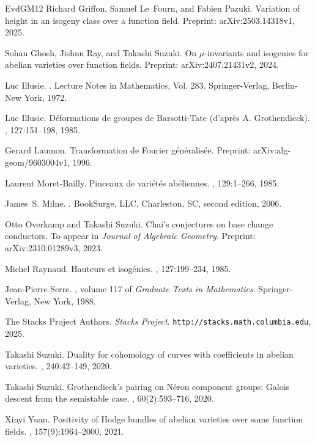\documentclass{amsart}
\theoremstyle{remark}
\numberwithin{equation}{section}
\begin{document}
\begin{thebibliography}{EvdGM12}
Richard Griffon, Samuel Le~Fourn, and Fabien Pazuki.
\newblock Variation of height in an isogeny class over a function field.
\newblock Preprint: arXiv:2503.14318v1, 2025.

Sohan Ghosh, Jishnu Ray, and Takashi Suzuki.
\newblock On {$\mu$}-invariants and isogenies for abelian varieties over
  function fields.
\newblock Preprint: arXiv:2407.21431v2, 2024.

Luc Illusie.
.
\newblock Lecture Notes in Mathematics, Vol. 283. Springer-Verlag, Berlin-New
  York, 1972.

Luc Illusie.
\newblock D\'{e}formations de groupes de {B}arsotti-{T}ate (d'apr\`es {A}.
  {G}rothendieck).
, 127:151--198, 1985.

Gerard Laumon.
\newblock Transformation de {F}ourier g\'{e}n\'{e}ralis\'{e}e.
\newblock Preprint: arXiv:alg-geom/9603004v1, 1996.

Laurent Moret-Bailly.
\newblock Pinceaux de vari\'{e}t\'{e}s ab\'{e}liennes.
, 129:1--266, 1985.

James~S. Milne.
.
\newblock BookSurge, LLC, Charleston, SC, second edition, 2006.

Otto Overkamp and Takashi Suzuki.
\newblock Chai's conjectures on base change conductors.
\newblock To appear in \textit{Journal of Algebraic Geometry}. Preprint:
  arXiv:2310.01289v3, 2023.

Michel Raynaud.
\newblock Hauteurs et isog\'{e}nies.
, 127:199--234, 1985.

Jean-Pierre Serre.
, volume 117 of {\em Graduate
  Texts in Mathematics}.
\newblock Springer-Verlag, New York, 1988.

The {Stacks Project Authors}.
\newblock \textit{Stacks Project}.
\newblock \verb+http://stacks.math.columbia.edu+, 2025.

Takashi Suzuki.
\newblock Duality for cohomology of curves with coefficients in abelian
  varieties.
, 240:42--149, 2020.

Takashi Suzuki.
\newblock Grothendieck's pairing on {N}\'{e}ron component groups: {G}alois
  descent from the semistable case.
, 60(2):593--716, 2020.

Xinyi Yuan.
\newblock Positivity of {H}odge bundles of abelian varieties over some function
  fields.
, 157(9):1964--2000, 2021.

\end{thebibliography}
\end{document}
